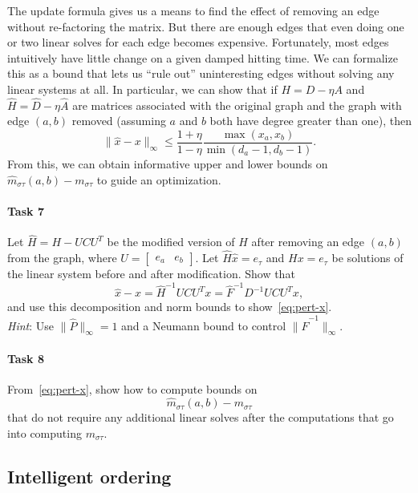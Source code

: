 \documentclass[12pt, leqno]{article}
\begin{document}
The update formula gives us a means to find the effect of removing an
edge without re-factoring the matrix.  But there are enough edges that
even doing one or two linear solves for each edge becomes expensive.
Fortunately, most edges intuitively have little change on a given
damped hitting time.  We can formalize this as a bound that lets us
``rule out'' uninteresting edges without solving any linear systems at
all.  In particular, we can show that if $H = D-\eta A$ and
$\hat{H} = \hat{D} - \eta \hat{A}$ are matrices associated with the
original graph and the graph with edge $(a,b)$ removed (assuming $a$
and $b$ both have degree greater than one), then
\begin{equation} \label{eq:pert-x}
\|\hat{x}-x\|_{\infty} \leq
  \frac{1+\eta}{1-\eta}
  \frac{\max(x_a, x_b)}{\min(d_a-1, d_b-1)}.
\end{equation}
From this, we can obtain informative upper and lower bounds on
$\hat{m}_{\sigma \tau}(a,b)-m_{\sigma \tau}$ to guide an optimization.

\paragraph*{Task 7}
Let $\hat{H} = H - UCU^T$ be the modified version of $H$ after
removing an edge $(a,b)$ from the graph,
where $U = \begin{bmatrix} e_a & e_b \end{bmatrix}$.  Let
$\hat{H} \hat{x} = e_{\tau}$ and $Hx = e_{\tau}$ be solutions
of the linear system before and after modification.
Show that
\[
  \hat{x}-x = \hat{H}^{-1} UCU^T x = \hat{F}^{-1} D^{-1} U C U^T x,
\]
and use this decomposition and norm bounds to show~\eqref{eq:pert-x}. \\[1mm]
{\em Hint}: Use $\|\hat{P}\|_\infty = 1$ and a Neumann
bound to control $\|\hat{F}^{-1}\|_\infty$.

\paragraph*{Task 8}
From~\eqref{eq:pert-x}, show how to compute bounds on
\[
  \hat{m}_{\sigma \tau}(a,b) - m_{\sigma \tau}
\]
that do not require any additional linear solves after
the computations that go into computing $m_{\sigma \tau}$.

\subsection*{Intelligent ordering}
\end{document}
